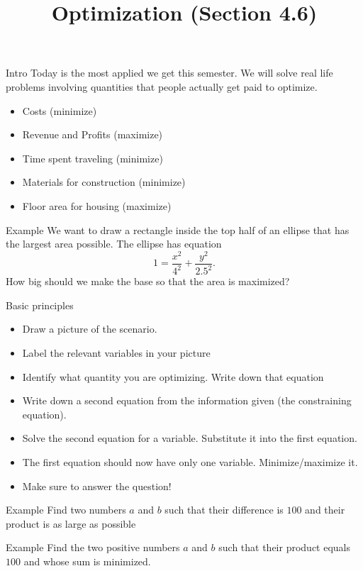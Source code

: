 \documentclass[t]{beamer}
\title{Optimization (Section 4.6)}
\date{}
\begin{document}
\frame{\titlepage}

\begin{frame}{Intro}
Today is the most applied we get this semester.  We will 
solve real life problems involving quantities that people
actually get paid to optimize.

\begin{itemize}
\item Costs (minimize)
\item Revenue and Profits (maximize)
\item Time spent traveling (minimize)
\item Materials for construction (minimize)
\item Floor area for housing (maximize)
\end{itemize}
\end{frame}

\begin{frame}{Example}
We want to draw a rectangle inside the top half of an ellipse that
has the largest area possible.  The ellipse has equation 
$$ 1 = \frac{x^2}{4^2} + \frac{y^2}{2.5^2}. $$
How big should we make the base so that the area is maximized?
\end{frame}

\begin{frame}{Basic principles}
\begin{itemize}
\item Draw a picture of the scenario.  
\item Label the relevant variables in your picture
\item Identify what quantity you are optimizing.  Write down
that equation
\item Write down a second equation from the information given
(the constraining equation).
\item Solve the second equation for a variable.  Substitute it
into the first equation.
\item The first equation should now have only one variable. 
Minimize/maximize it.
\item Make sure to answer the question!
\end{itemize}
\end{frame}

\begin{frame}{Example}
Find two numbers $a$ and $b$ such that their difference is $100$ and
their product is as large as possible
\end{frame}

\begin{frame}{Example}
Find the two positive numbers $a$ and $b$ such that their product equals $100$ and whose sum is minimized.
\end{frame}
\end{document}
